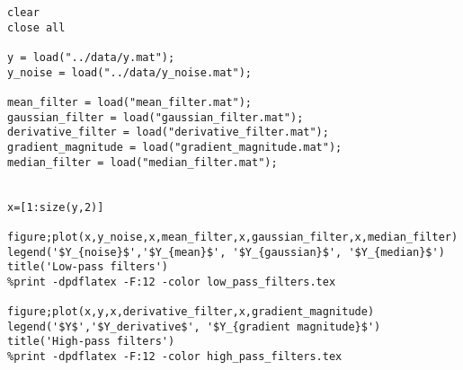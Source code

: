 \documentclass[english,a4paper,12pt,oneside]{article}
\begin{document}
\begin{lstlisting}
clear
close all

y = load("../data/y.mat");
y_noise = load("../data/y_noise.mat");

mean_filter = load("mean_filter.mat");
gaussian_filter = load("gaussian_filter.mat");
derivative_filter = load("derivative_filter.mat");
gradient_magnitude = load("gradient_magnitude.mat");
median_filter = load("median_filter.mat");


x=[1:size(y,2)]

figure;plot(x,y_noise,x,mean_filter,x,gaussian_filter,x,median_filter)
legend('$Y_{noise}$','$Y_{mean}$', '$Y_{gaussian}$', '$Y_{median}$')
title('Low-pass filters')
%print -dpdflatex -F:12 -color low_pass_filters.tex

figure;plot(x,y,x,derivative_filter,x,gradient_magnitude)
legend('$Y$','$Y_derivative$', '$Y_{gradient magnitude}$')
title('High-pass filters')
%print -dpdflatex -F:12 -color high_pass_filters.tex
\end{lstlisting}
\end{document}
